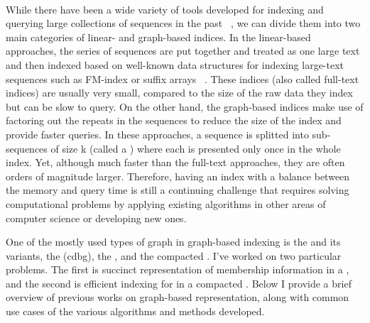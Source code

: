 \paragraph*{}
While there have been a wide variety of tools developed
for indexing and querying large collections of sequences in the past
~\citep{li2008mapping,langmead2009ultrafast,li2009fast,hach2010mrsfast,langmead2012fast,li2013aligning,liao2013subread,dobin2013star,kim2015hisat},
we can divide them into two main categories of linear- and graph-based indices.
In the linear-based approaches, the series of sequences are put together and treated as one large text
and then indexed based on well-known data structures for indexing large-text sequences
such as FM-index or suffix arrays
~\citep{langmead2009ultrafast,li2009fast,langmead2012fast,li2013aligning,dobin2013star,kim2015hisat}.
These indices (also called full-text indices) are usually very small, compared to the size of the
raw data they index but can be slow to query.
On the other hand, the graph-based indices make use of factoring out the repeats in the sequences
to reduce the size of the index and provide faster queries.
In these approaches, a sequence is
splitted into sub-sequences of size k (called a \kmer) where each \kmer is presented only once
in the whole index.
Yet, although much faster than the full-text approaches, they are often orders of magnitude larger.
Therefore, having an index with a balance between the memory and query time
is still a continuing challenge that requires solving computational problems by applying
existing algorithms in other areas of computer science or developing new ones.

One of the mostly used types of graph in graph-based indexing is the \dbg
and its variants, the \longcdbg (cdbg), the \compdbg, and the compacted \longcdbg.
I’ve worked on two particular problems. The first is succinct representation of membership information
in a \longcdbg, and the second is efficient indexing for \kmers
in a compacted \longcdbg.
Below I provide a brief overview of previous works on graph-based representation,
along with common use cases of the various algorithms and methods developed.

